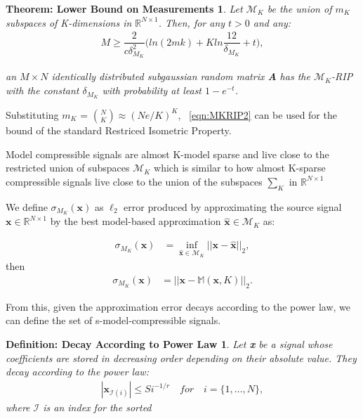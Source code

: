 \documentclass[titlepage,oneside, 12pt]{book}
\theoremstyle{break}
\begin{document}
\newtheorem*{MKRIP2}{Theorem: Lower Bound on Measurements }
\begin{MKRIP2}
Let $\mathcal{M}_{K}$ be the union of $m_{K}$ subspaces of K-dimensions in $\mathbb{R}^{N \times 1}$. Then, for any $t > 0$ and any: 
\begin{equation}
\begin{gathered}
M \geq \dfrac{2}{c\delta^2_{M_{K}}}\big(ln(2mk) + K ln\dfrac{12}{\delta_{M_{K}}} + t \big),
\end{gathered}
\label{eqn:MKRIP2}
\end{equation}

an $M \times N$ identically distributed subgaussian random matrix \textbf{A}
has the $\mathcal{M}_{K}$-RIP with the constant $\delta_{M_{K}}$  with probability at least $1 - e^{-t}$. 

\end{MKRIP2}

Substituting $m_{K}$ = $\binom NK \approx (Ne/K)^{K}$, ~\ref{eqn:MKRIP2} can be used for the bound of the standard Restriced Isometric Property. 

Model compressible signals are almost K-model sparse and live close to the restricted union of subspaces $\mathcal{M}_{K}$ which is similar to how almost K-sparse compressible signals live close to the union of the subspaces $\sum_{K}$ in $\mathbb{R}^{N \times 1}$

We define $\sigma_{M_{K}}(\textbf{x})$ as  $\ell_2$ error produced by approximating the source signal $ \textbf{x} \in \mathbb{R}^{N \times 1}$ by the best model-based approximation $\hat{\textbf{x}} \in \mathcal{M}_{K}$	as: 

\begin{align}
\sigma_{M_{K}}(\textbf{x}) &= \underset{\hat{\textbf{x}} \in \mathcal{M}_{K}} \inf ||\textbf{x} - \hat{\textbf{x}}||_2,
\end{align}
then
\begin{align}
\sigma_{M_{K}}(\textbf{x}) &= ||\textbf{x} - \mathbb{M}(\textbf{x},K)||_2.
\end{align}
\label{eqn:MKRIP3}

From this, given the approximation error decays according to the power law, we can define the set of s-model-compressible signals.

\newtheorem*{Power}{Definition: Decay According to Power Law }
\begin{Power}
Let \textbf{x} be a signal whose coefficients are stored in decreasing order depending on their absolute value. They decay according to the power law:
\begin{equation}
\begin{gathered}
|\textbf{x}_{\mathcal{I}(i)}| \leq Si^{-1/r}\quad for \quad i = \{1,\ldots,N\}, 
\end{gathered}
\label{eqn:Power}
\end{equation}
where $\mathcal{I}$ is an index for the sorted
\end{Power}
\end{document}
